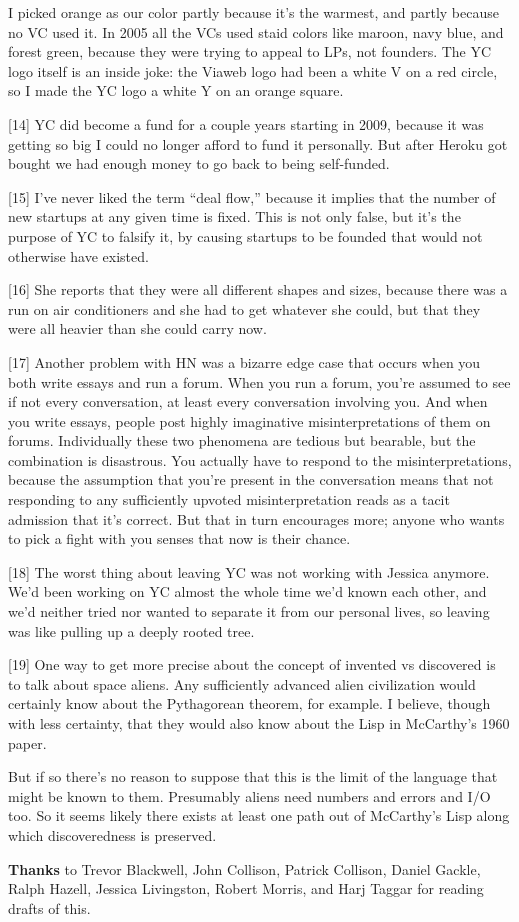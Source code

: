 I picked orange as our color partly because it's the warmest, and partly
because no VC used it. In 2005 all the VCs used staid colors like
maroon, navy blue, and forest green, because they were trying to appeal
to LPs, not founders. The YC logo itself is an inside joke: the Viaweb
logo had been a white V on a red circle, so I made the YC logo a white Y
on an orange square.

{[}14{]} YC did become a fund for a couple years starting in 2009,
because it was getting so big I could no longer afford to fund it
personally. But after Heroku got bought we had enough money to go back
to being self-funded.

{[}15{]} I've never liked the term ``deal flow,'' because it implies
that the number of new startups at any given time is fixed. This is not
only false, but it's the purpose of YC to falsify it, by causing
startups to be founded that would not otherwise have existed.

{[}16{]} She reports that they were all different shapes and sizes,
because there was a run on air conditioners and she had to get whatever
she could, but that they were all heavier than she could carry now.

{[}17{]} Another problem with HN was a bizarre edge case that occurs
when you both write essays and run a forum. When you run a forum, you're
assumed to see if not every conversation, at least every conversation
involving you. And when you write essays, people post highly imaginative
misinterpretations of them on forums. Individually these two phenomena
are tedious but bearable, but the combination is disastrous. You
actually have to respond to the misinterpretations, because the
assumption that you're present in the conversation means that not
responding to any sufficiently upvoted misinterpretation reads as a
tacit admission that it's correct. But that in turn encourages more;
anyone who wants to pick a fight with you senses that now is their
chance.

{[}18{]} The worst thing about leaving YC was not working with Jessica
anymore. We'd been working on YC almost the whole time we'd known each
other, and we'd neither tried nor wanted to separate it from our
personal lives, so leaving was like pulling up a deeply rooted tree.

{[}19{]} One way to get more precise about the concept of invented vs
discovered is to talk about space aliens. Any sufficiently advanced
alien civilization would certainly know about the Pythagorean theorem,
for example. I believe, though with less certainty, that they would also
know about the Lisp in McCarthy's 1960 paper.

But if so there's no reason to suppose that this is the limit of the
language that might be known to them. Presumably aliens need numbers and
errors and I/O too. So it seems likely there exists at least one path
out of McCarthy's Lisp along which discoveredness is preserved.

\textbf{Thanks} to Trevor Blackwell, John Collison, Patrick Collison,
Daniel Gackle, Ralph Hazell, Jessica Livingston, Robert Morris, and Harj
Taggar for reading drafts of this.
